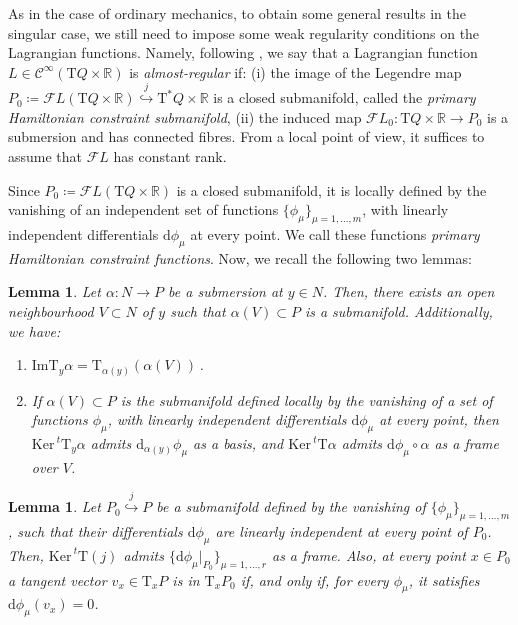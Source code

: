 \documentclass[11pt]{article}
\theoremstyle{plain}
\newtheorem{lemma}[theorem]{Lemma}
\theoremstyle{definition}
\newcommand{\R}{\mathbb{R}}
\renewcommand{\d}{\mathrm{d}}
\newcommand{\Cinfty}{\mathscr{C}^\infty}
\newcommand{\T}{{\mathrm T}}
\let\Tan\T
\def\d{\mathrm{d}}
\def\d{\mathrm{d}}
\def\Ker{\mathrm{Ker \,}}
\def\Tan{\mathrm{T}}
\def\FL{\mathcal{F} L}
\begin{document}
As in the case of ordinary
mechanics, to obtain some general results in the singular case, we still need to impose some weak regularity conditions on the Lagrangian functions.
Namely, following \cite{GN_79}, we say that a Lagrangian function $L\in \Cinfty(\T Q \times \R)$ is \textsl{almost-regular} if: 
(i)   the image of the Legendre map $P_0 \coloneqq \FL(\Tan Q\times\R) \overset{j}{\hookrightarrow} \Tan^*Q\times \R$ is a closed submanifold, called the \textsl{primary Hamiltonian constraint submanifold}, 
(ii) the induced map $\FL_0 \colon \Tan Q\times \R\to P_0$ is a submersion and has connected fibres.
From a local point of view, it suffices to assume that $\FL$ has constant rank.

Since $P_0 \coloneqq \FL (\Tan Q\times \R)$ is a closed submanifold, it is locally defined by the vanishing of an independent set of functions $\{\phi_{\mu}\}_{\mu=1,\dots,m}$, with linearly independent differentials $\d \phi_{\mu}$ at every point. We call these functions \textsl{primary Hamiltonian constraint functions}. 
Now, we recall the following two lemmas:
\begin{lemma}\label{lemma_ker_1}
    Let $\alpha \colon N \to P $ be a submersion at $y\in N$. Then, there exists an open neighbourhood $V\subset N$ of $y$ such that $\alpha(V)\subset P$ is a submanifold. Additionally, we have:
    \begin{enumerate}
        \item $\mathrm{Im} \Tan_y \alpha = \Tan_{\alpha(y)}(\alpha(V))$\,.
        \item If $\alpha(V) \subset P$ is the submanifold defined locally by the vanishing of a set of functions $\phi_{\mu}$, with linearly independent differentials $\d \phi_{\mu}$ at every point, then $\Ker ^t \Tan_y\alpha$ admits $\d_{\alpha(y)} \phi_{\mu}$ as a basis, and $\Ker ^t \Tan\alpha$ admits $\d\phi_{\mu}\circ \alpha$ as a frame over $V$.
    \end{enumerate}
\end{lemma}

\begin{lemma} \label{lemma_ker_2}
    Let $P_0 \overset{j}{\hookrightarrow} P$ be a submanifold defined by the vanishing of $\{\phi_{\mu}\}_{\mu=1,\dots,m}$, such that their differentials $\d \phi_{\mu}$ are linearly independent at every point of $P_0$. Then, $\Ker ^t\Tan (j)$ admits $\{\d \phi_{\mu} |_{P_0}\}_{\mu=1,\dots,r}$ as a frame. Also, at every point $x\in P_0$ a tangent vector $v_x \in \Tan_x P$ is in $\Tan_x P_0$ if, and only if, for every $\phi_{\mu}$, it satisfies $\d\phi_{\mu}(v_x)=0$.
\end{lemma}
\end{document}
